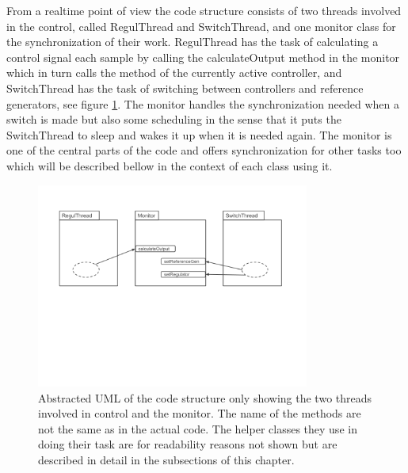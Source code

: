 
From a realtime point of view the code structure consists of two threads involved in the control, called RegulThread and SwitchThread, and one monitor class for the synchronization of their work. 
RegulThread has the task of calculating a control signal each sample by calling the calculateOutput method in the monitor which in turn calls the method of the currently active controller, and SwitchThread has the task of switching between controllers and reference generators, see figure \ref{overall_fig}. 
The monitor handles the synchronization needed when a switch is made but also some scheduling in the sense that it puts the SwitchThread to sleep and wakes it up when it is needed again.
The monitor is one of the central parts of the code and offers synchronization for other tasks too which will be described bellow in the context of each class using it. 
\begin{figure}
\centering
\includegraphics[width=0.8\textwidth]{figures/Overall.png}
\caption{Abstracted UML of the code structure only showing the two threads involved in control and the monitor. 
The name of the methods are not the same as in the actual code. 
The helper classes they use in doing their task are for readability reasons not shown but are described in detail in the subsections of this chapter.}
\label{overall_fig}
\end{figure}

